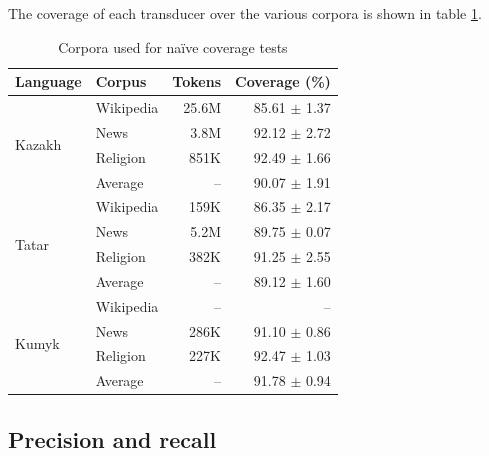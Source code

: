 \documentclass[a4paper,11pt,twocolumn]{article}
\begin{document}



The coverage of each transducer over the various corpora is shown in table \ref{table:corpora}.

\begin{table}
\begin{center}
\begin{tabular}{llrr}
\toprule
\textbf{Language} & \textbf{Corpus} & \textbf{Tokens} & \textbf{Coverage} (\%) \\
\midrule
\multirow{4}{*}{Kazakh} & Wikipedia & 25.6M & 85.61 $\pm$ 1.37 \\
	& News & 3.8M & 92.12 $\pm$ 2.72  \\
	& Religion & 851K & 92.49 $\pm$ 1.66 \\\cline{2-4}
	& Average & -- & 90.07 $\pm$ 1.91 \\
\midrule
\multirow{4}{*}{Tatar} & Wikipedia & 159K & 86.35 $\pm$ 2.17 \\
	& News & 5.2M & 89.75 $\pm$ 0.07 \\
	& Religion & 382K & 91.25 $\pm$ 2.55 \\\cline{2-4}
	& Average & -- & 89.12 $\pm$ 1.60 \\
\midrule
\multirow{4}{*}{Kumyk} & Wikipedia & -- & -- \\
        & News & 286K &  91.10 $\pm$ 0.86 \\
	& Religion & 227K & 92.47 $\pm$ 1.03 \\\cline{2-4}
	& Average & -- & 91.78 $\pm$ 0.94 \\
\bottomrule
\end{tabular}
 \caption{Corpora used for naïve coverage tests}
 \label{table:corpora}
\end{center}
\end{table}

\subsection{Precision and recall}
\end{document}

